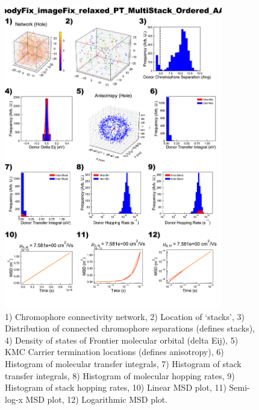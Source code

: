 \documentclass[12pt]{article}
\begin{document}
\begin{figure}[h]\centering
	\includegraphics[width=0.85\textwidth]{Figures/bodyFix_imageFix_relaxed_PT_MultiStack_Ordered_AA.png}
    \caption{   1) Chromophore connectivity network, 
                2) Location of `stacks', 
                3) Distribution of connected chromophore separations (defines stacks),
                4) Density of states of Frontier molecular orbital (delta Eij),
                5) KMC Carrier termination locations (defines anisotropy),
                6) Histogram of molecular transfer integrals,
                7) Histogram of stack transfer integrals,
                8) Histogram of molecular hopping rates,
                9) Histogram of stack hopping rates,
                10) Linear MSD plot,
                11) Semi-log-x MSD plot,
                12) Logarithmic MSD plot.}
	\label{fig:PTMultOrd}
\end{figure}
\end{document}
